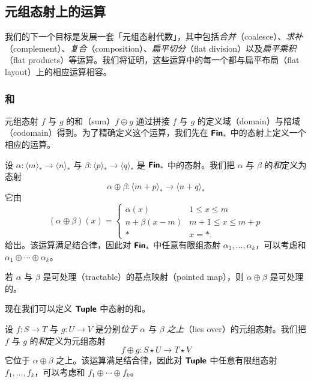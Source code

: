\subsection{元组态射上的运算}


\noindent 我们的下一个目标是发展一套「元组态射代数」，其中包括{\it 合并}（coalesce）、{\it 求补}（complement）、{\it 复合}（composition）、{\it 扁平切分}（flat division）以及{\it 扁平乘积}（flat products）等运算。我们将证明，这些运算中的每一个都与扁平布局（flat layout）上的相应运算相容。


\subsubsection{和}
元组态射 $f$ 与 $g$ 的和（sum）$f \oplus g$ 通过拼接 $f$ 与 $g$ 的定义域（domain）与陪域（codomain）得到。为了精确定义这个运算，我们先在 ${\boldsymbol{\mathsf{Fin}}}_*$ 中的态射上定义一个相应的运算。

\begin{definition}
    设 $\alpha: \langle m \rangle_* \to \langle n \rangle_*$ 与 $\beta: \langle p \rangle_* \to \langle q \rangle_*$ 是 ${\boldsymbol{\mathsf{Fin}}}_*$ 中的态射。我们把 $\alpha$ 与 $\beta$ 的{\it 和}定义为态射
    \[
    \alpha \oplus \beta : \langle m + p \rangle_* \to \langle n + q \rangle_*
    \]
    它由
    \[
(\alpha\oplus\beta)(x) = \begin{cases}
    \alpha(x) & 1 \leq x \leq m\\
    n + \beta( x - m) & m+1 \leq x \leq m + p\\
    * & x = *.
\end{cases}
\]
给出。该运算满足结合律，因此对 ${\boldsymbol{\mathsf{Fin}}}_*$ 中任意有限组态射 $\alpha_1,\dots,\alpha_k$，可以考虑和 $\alpha_1 \oplus \cdots \oplus \alpha_k$。
\end{definition}

\begin{remark}
    若 $\alpha$ 与 $\beta$ 是可处理（tractable）的基点映射（pointed map），则 $\alpha \oplus \beta$ 是可处理的。
\end{remark}

\noindent 现在我们可以定义 ${\boldsymbol{\mathsf{Tuple}}}$ 中态射的和。

\begin{definition}\label{sumofmorphismsinC} 设 $f:S \to T$ 与 $g:U \to V$ 是分别{\it 位于} $\alpha$ 与 $\beta$ {\it 之上}（lies over）的元组态射。我们把 $f$ 与 $g$ 的{\it 和}定义为元组态射
\[f \oplus g: S \star U \to T \star V\]
它位于 $\alpha \oplus \beta$ 之上。该运算满足结合律，因此对 ${\boldsymbol{\mathsf{Tuple}}}$ 中任意有限组态射 $f_1,\dots,f_k$，可以考虑和 $f_1 \oplus \cdots \oplus f_k$。
\end{definition}


